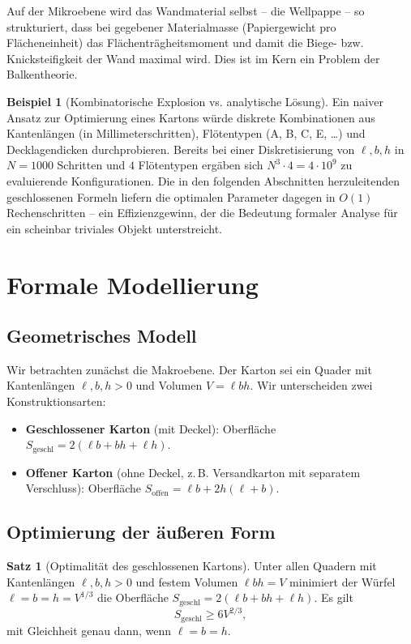 ﻿\documentclass[a4paper,12pt]{article}
\theoremstyle{definition}
\newtheorem{beispiel}{Beispiel}
\newtheorem{satz}{Satz}
\begin{document}
Auf der Mikroebene wird das Wandmaterial selbst -- die Wellpappe -- so strukturiert,
dass bei gegebener Materialmasse (Papiergewicht pro Flächeneinheit) das
Flächenträgheitsmoment und damit die Biege- bzw. Knicksteifigkeit der Wand maximal
wird. Dies ist im Kern ein Problem der Balkentheorie.

\begin{beispiel}[Kombinatorische Explosion vs. analytische Lösung]
	Ein naiver Ansatz zur Optimierung eines Kartons würde diskrete Kombinationen
	aus Kantenlängen (in Millimeterschritten), Flötentypen (A, B, C, E, \ldots)
	und Decklagendicken durchprobieren. Bereits bei einer Diskretisierung von
	$\ell, b, h$ in $N = 1000$ Schritten und $4$ Flötentypen ergäben sich
	$N^3 \cdot 4 = 4 \cdot 10^9$ zu evaluierende Konfigurationen. Die in den
	folgenden Abschnitten herzuleitenden geschlossenen Formeln liefern die
	optimalen Parameter dagegen in $O(1)$ Rechenschritten -- ein Effizienzgewinn,
	der die Bedeutung formaler Analyse für ein scheinbar triviales Objekt
	unterstreicht.
\end{beispiel}

\section{Formale Modellierung}

\subsection{Geometrisches Modell}

Wir betrachten zunächst die Makroebene. Der Karton sei ein Quader mit Kantenlängen
$\ell, b, h > 0$ und Volumen $V = \ell b h$. Wir unterscheiden zwei Konstruktionsarten:

\begin{itemize}
	\item \textbf{Geschlossener Karton} (mit Deckel): Oberfläche
	      $S_{\mathrm{geschl}} = 2(\ell b + bh + \ell h)$.
	\item \textbf{Offener Karton} (ohne Deckel, z.\,B. Versandkarton mit
	      separatem Verschluss): Oberfläche
	      $S_{\mathrm{offen}} = \ell b + 2h(\ell + b)$.
\end{itemize}

\subsection{Optimierung der äußeren Form}

\begin{satz}[Optimalität des geschlossenen Kartons]
	\label{satz:wuerfel}
	Unter allen Quadern mit Kantenlängen $\ell, b, h > 0$ und festem Volumen
	$\ell b h = V$ minimiert der Würfel $\ell = b = h = V^{1/3}$ die Oberfläche
	$S_{\mathrm{geschl}} = 2(\ell b + bh + \ell h)$. Es gilt
	\[
		S_{\mathrm{geschl}} \geq 6V^{2/3},
	\]
	mit Gleichheit genau dann, wenn $\ell = b = h$.
\end{satz}
\end{document}

